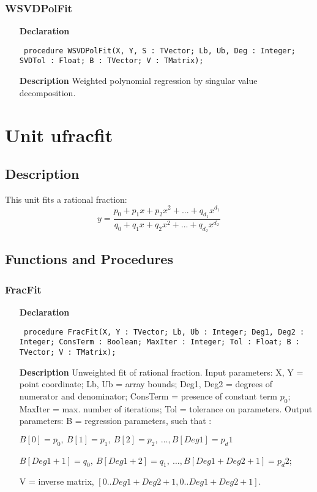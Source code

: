\documentclass[12pt,a4paper,oneside]{report}
\newcommand{\declarationitem}[1]{\textbf{#1}}
\newcommand{\descriptiontitle}[1]{\textbf{#1}}
\newcommand{\code}[1]{\texttt{#1}}
\begin{document}
\subsubsection{WSVDPolFit}
\label{upolfit-WSVDPolFit}
\begin{itemize}\item[\declarationitem{Declaration}\hfill]
	\begin{flushleft}
		\code{
			procedure WSVDPolFit(X, Y, S : TVector; Lb, Ub, Deg : Integer; SVDTol : Float; B : TVector; V : TMatrix);}
		
	\end{flushleft}
	
	\par
	\item[\descriptiontitle{Description}]
	Weighted polynomial regression by singular value decomposition.
	
\end{itemize}
\section{Unit ufracfit}
\label{ufracfit}
\subsection{Description}
This unit fits a rational fraction:
$$y=\frac{p_0 + p_1 x + p_2 x^2 + ... + q_{d_1} x^{d_1}}{q_0 + q_1 x + q_2 x^2 + ... + q_{d_2} x^{d_2}}$$
\subsection{Functions and Procedures}
\subsubsection{FracFit}
\label{ufracfit-FracFit}
\begin{itemize}\item[\declarationitem{Declaration}\hfill]
	\begin{flushleft}
		\code{
			procedure FracFit(X, Y : TVector; Lb, Ub : Integer; Deg1, Deg2 : Integer; ConsTerm : Boolean; MaxIter : Integer; Tol : Float; B : TVector; V : TMatrix);}
		
	\end{flushleft}
	
	\par
	\item[\descriptiontitle{Description}]
	Unweighted fit of rational fraction. Input parameters: X, Y = point coordinate; Lb, Ub = array bounds; Deg1, Deg2 = degrees of numerator and denominator; ConsTerm = presence of constant term $p_0$; MaxIter = max. number of iterations; Tol = tolerance on parameters. Output parameters: B = regression parameters, such that :
	
	$B[0] = p_0,\ B[1] = p_1,\ B[2] = p_2,\ \dots, B[Deg1] = p_d1$
	
	$B[Deg1 + 1] = q_0,\ B[Deg1 + 2] = q_1,\  \dots, B[Deg1+Deg2+1] = p_d2$; 
	
	V = inverse matrix, $[0..Deg1+Deg2+1,0..Deg1+Deg2+1]$.
	
\end{itemize}
\end{document}
